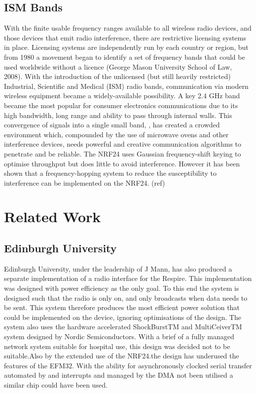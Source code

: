 \subsection{ISM Bands}
With the finite usable frequency ranges available to all wireless radio devices, and those devices that
emit radio interference, there are restrictive licensing systems in place. Licensing systems are
independently run by each country or region, but from 1980 a movement began to identify a set of
frequency bands that could be used worldwide without a licence (George Mason University School
of Law, 2008). With the introduction of the unlicensed (but still heavily restricted) Industrial,
Scientific and Medical (ISM) radio bands, communication via modern wireless equipment became a
widely-available possibility. A key 2.4 GHz band became the most popular for consumer electronics
communications due to its high bandwidth, long range and ability to pass through internal walls. This
convergence of signals into a single small band, , has created a crowded environment which,
compounded by the use of microwave ovens and other interference devices, needs powerful and
creative communication algorithms to penetrate and be reliable. The NRF24 uses Gaussian
frequency-shift keying to optimise throughput but does little to avoid interference. However it has
been shown that a frequency-hopping system to reduce the susceptibility to interference can be
implemented on the NRF24. (ref)


\section{Related Work}

\subsection{Edinburgh University}
Edinburgh University, under the leadership of J Mann, has also produced a separate implementation
of a radio interface for the Respire. This implementation was designed with power efficiency as the
only goal. To this end the system is designed such that the radio is only on, and only broadcasts
when data needs to be sent. This system therefore produces the most efficient power solution that
could be implemented on the device, ignoring optimisations of the design. The system also uses the
hardware accelerated ShockBurstTM and MultiCeiverTM system designed by Nordic Semiconductors.
With a brief of a fully managed network system suitable for hospital use, this design was decided not
to be suitable.Also by the extended use of the NRF24.the design has underused the features of the
EFM32. With the ability for asynchronously clocked serial transfer automated by and interrupts and
managed by the DMA not been utilised a similar chip could have been used.

